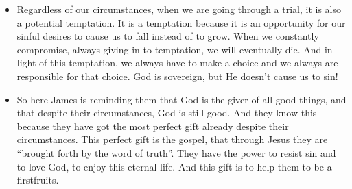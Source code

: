 \begin{itemize}
{\begin{enumerate}
  \end{enumerate}
  }
  \item{Regardless of our circumstances, when we are going through a trial, it is also a potential temptation. It is a temptation because it is an opportunity for our sinful desires to cause us to fall instead of to grow. When we constantly compromise, always giving in to temptation, we will eventually die. And in light of this temptation, we always have to make a choice and we always are responsible for that choice. God is sovereign, but He doesn’t cause us to sin! }
  \item{So here James is reminding them that God is the giver of all good things, and that despite their circumstances, God is still good. And they know this because they have got the most perfect gift already despite their circumstances. This perfect gift is the gospel, that through Jesus they are “brought forth by the word of truth”. They have the power to resist sin and to love God, to enjoy this eternal life. And this gift is to help them to be a firstfruits.}
\end{itemize}